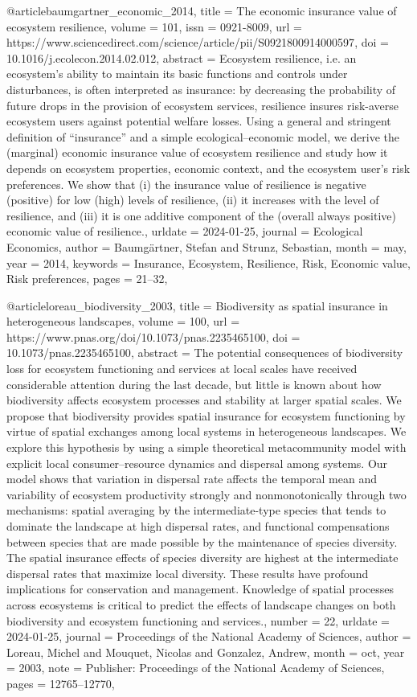 {{{@article{baumgartner_economic_2014,
	title = {The economic insurance value of ecosystem resilience},
	volume = {101},
	issn = {0921-8009},
	url = {https://www.sciencedirect.com/science/article/pii/S0921800914000597},
	doi = {10.1016/j.ecolecon.2014.02.012},
	abstract = {Ecosystem resilience, i.e. an ecosystem's ability to maintain its basic functions and controls under disturbances, is often interpreted as insurance: by decreasing the probability of future drops in the provision of ecosystem services, resilience insures risk-averse ecosystem users against potential welfare losses. Using a general and stringent definition of “insurance” and a simple ecological–economic model, we derive the (marginal) economic insurance value of ecosystem resilience and study how it depends on ecosystem properties, economic context, and the ecosystem user's risk preferences. We show that (i) the insurance value of resilience is negative (positive) for low (high) levels of resilience, (ii) it increases with the level of resilience, and (iii) it is one additive component of the (overall always positive) economic value of resilience.},
	urldate = {2024-01-25},
	journal = {Ecological Economics},
	author = {Baumgärtner, Stefan and Strunz, Sebastian},
	month = may,
	year = {2014},
	keywords = {Insurance, Ecosystem, Resilience, Risk, Economic value, Risk preferences},
	pages = {21--32},
}

@article{loreau_biodiversity_2003,
	title = {Biodiversity as spatial insurance in heterogeneous landscapes},
	volume = {100},
	url = {https://www.pnas.org/doi/10.1073/pnas.2235465100},
	doi = {10.1073/pnas.2235465100},
	abstract = {The potential consequences of biodiversity loss for ecosystem functioning and services at local scales have received considerable attention during the last decade, but little is known about how biodiversity affects ecosystem processes and stability at larger spatial scales. We propose that biodiversity provides spatial insurance for ecosystem functioning by virtue of spatial exchanges among local systems in heterogeneous landscapes. We explore this hypothesis by using a simple theoretical metacommunity model with explicit local consumer–resource dynamics and dispersal among systems. Our model shows that variation in dispersal rate affects the temporal mean and variability of ecosystem productivity strongly and nonmonotonically through two mechanisms: spatial averaging by the intermediate-type species that tends to dominate the landscape at high dispersal rates, and functional compensations between species that are made possible by the maintenance of species diversity. The spatial insurance effects of species diversity are highest at the intermediate dispersal rates that maximize local diversity. These results have profound implications for conservation and management. Knowledge of spatial processes across ecosystems is critical to predict the effects of landscape changes on both biodiversity and ecosystem functioning and services.},
	number = {22},
	urldate = {2024-01-25},
	journal = {Proceedings of the National Academy of Sciences},
	author = {Loreau, Michel and Mouquet, Nicolas and Gonzalez, Andrew},
	month = oct,
	year = {2003},
	note = {Publisher: Proceedings of the National Academy of Sciences},
	pages = {12765--12770},
}

}}}
